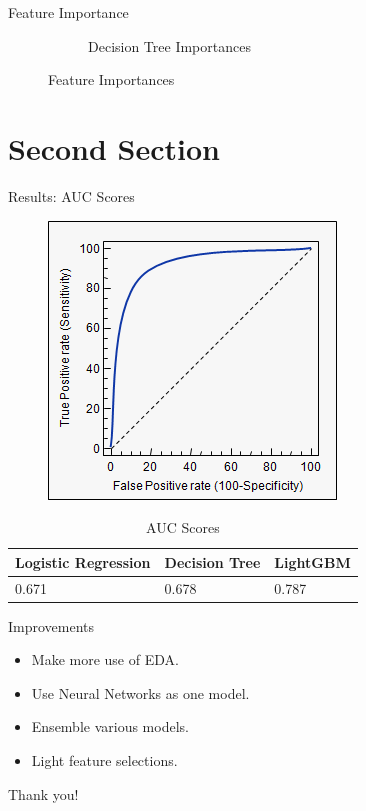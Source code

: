 \documentclass{beamer}
\begin{document}
\begin{frame}{Feature Importance}
\begin{figure}
\begin{subfigure}{.5\textwidth}
  \caption{Decision Tree Importances}
  \label{fig:sub2}
\end{subfigure}
\caption{Feature Importances}
\label{fig:feature_importances}
\end{figure}
\end{frame}

\section{Second Section}

\begin{frame}{Results: AUC Scores}
\begin{figure}
  \includegraphics[width=0.4\linewidth]{pic/auc_scores.png}
  \label{fig:auc}
\end{figure}
\begin{table}
\begin{tabular}{l l l}
\toprule
\textbf{Logistic Regression} & \textbf{Decision Tree} & \textbf{LightGBM}\\
\midrule
0.671 & 0.678 & 0.787 \\
\bottomrule
\end{tabular}
\caption{AUC Scores}
\end{table}
\end{frame}


\begin{frame}{Improvements}
\begin{itemize}
\item Make more use of EDA. 
\item Use Neural Networks as one model. 
\item Ensemble various models.
\item Light feature selections. 
\end{itemize}

\end{frame}


\begin{frame}
\Huge{\centerline{Thank you!}}
\end{frame}

\end{document}
